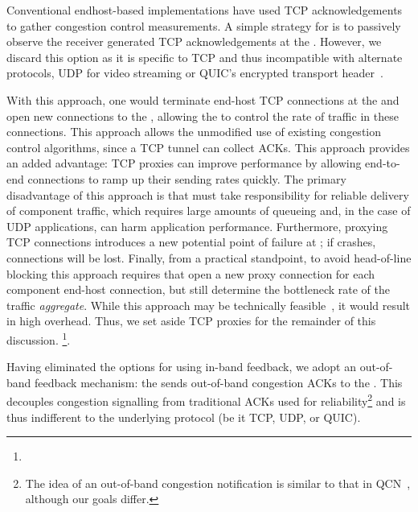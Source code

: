 
Conventional endhost-based implementations have used TCP acknowledgements to gather congestion control measurements. A simple strategy for \name is to passively observe the receiver generated TCP acknowledgements at the \inbox. However, we discard this option as it is specific to TCP and thus incompatible with alternate protocols, \ie UDP for video streaming or QUIC's encrypted transport header~\cite{quic}.

 With this approach, one would terminate end-host TCP connections at the \inbox and open new connections to the \outbox, allowing the \inbox to control the rate of traffic in these connections.
This approach allows the unmodified use of existing congestion control algorithms, since a TCP tunnel can collect ACKs. This approach provides an added advantage: TCP proxies can improve performance by allowing end-to-end connections to ramp up their sending rates quickly.  
The primary disadvantage of this approach is that \name must take responsibility for reliable delivery of component traffic, which requires large amounts of queueing and, in the case of UDP applications, can harm application performance. 
Furthermore, proxying TCP connections introduces a new potential point of failure at \name; if \name crashes, connections will be lost.
Finally, from a practical standpoint, to avoid head-of-line blocking this approach requires that \name open a new proxy connection for each component end-host connection, but still determine the bottleneck rate of the traffic \emph{aggregate}. While this approach may be technically feasible~\cite{cm}, it would result in high overhead. 
Thus, we set aside TCP proxies for the remainder of this discussion. 
\footnote{}.


 Having eliminated the options for using in-band feedback, we adopt an out-of-band feedback mechanism: the \outbox sends out-of-band congestion ACKs to the \inbox.
This decouples congestion signalling from traditional ACKs used for reliability\footnote{The idea of an out-of-band congestion notification is similar to that in QCN~\cite{qcn}, although our goals differ.} and is thus indifferent to the underlying protocol (be it TCP, UDP, or QUIC).

